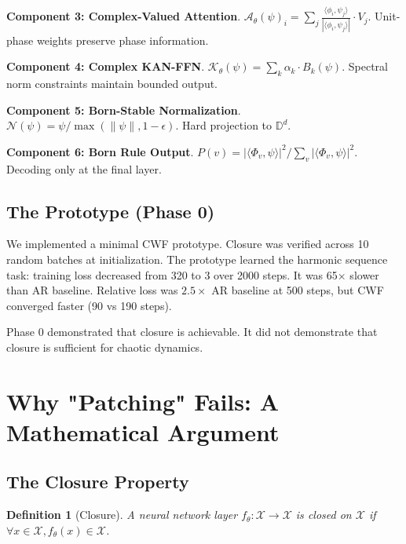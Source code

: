 \documentclass{article}
\newtheorem{definition}{Definition}
\begin{document}
\textbf{Component 3: Complex-Valued Attention}. $\mathcal{A}_\theta(\psi)_i = \sum_j \frac{\langle \phi_i, \psi_j \rangle}{|\langle \phi_i, \psi_j \rangle|} \cdot V_j$. Unit-phase weights preserve phase information.

\textbf{Component 4: Complex KAN-FFN}. $\mathcal{K}_\theta(\psi) = \sum_k \alpha_k \cdot B_k(\psi)$. Spectral norm constraints maintain bounded output.

\textbf{Component 5: Born-Stable Normalization}. $\mathcal{N}(\psi) = \psi / \max(\|\psi\|, 1 - \epsilon)$. Hard projection to $\mathbb{D}^d$.

\textbf{Component 6: Born Rule Output}. $P(v) = |\langle \Phi_v, \psi \rangle|^2 / \sum_v |\langle \Phi_v, \psi \rangle|^2$. Decoding only at the final layer.

\subsection{The Prototype (Phase 0)}

We implemented a minimal CWF prototype. Closure was verified across 10 random batches at initialization. The prototype learned the harmonic sequence task: training loss decreased from 320 to 3 over 2000 steps. It was 65$\times$ slower than AR baseline. Relative loss was $2.5\times$ AR baseline at 500 steps, but CWF converged faster (90 vs 190 steps).

Phase 0 demonstrated that closure is achievable. It did not demonstrate that closure is sufficient for chaotic dynamics.

\section{Why "Patching" Fails: A Mathematical Argument}

\subsection{The Closure Property}

\begin{definition}[Closure]
A neural network layer $f_\theta: \mathcal{X} \to \mathcal{X}$ is \emph{closed} on $\mathcal{X}$ if $\forall x \in \mathcal{X}, f_\theta(x) \in \mathcal{X}$.
\end{definition}
\end{document}
